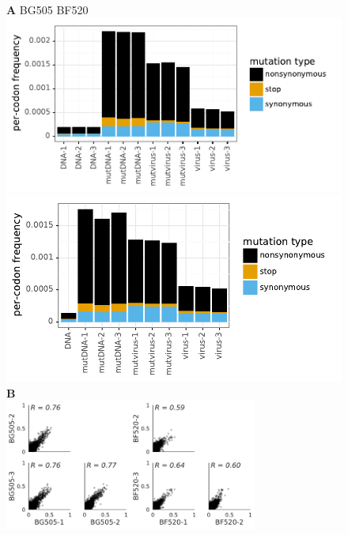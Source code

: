 \documentclass[9pt,lineno]{elife}
\begin{document}
\begin{figure}
{{\bf \Large A} \hspace{0.2\textwidth} BG505 \hspace{0.51\textwidth} BF520} \\
{\includegraphics[height=0.32\textwidth]{figures/BG505_avgmutfreqs.pdf}\includegraphics[clip=true,trim=0in 0in 1.7in 0in,height=0.32\textwidth]{figures/BF520_avgmutfreqs.pdf}} \\
{\bf \Large B} \\
{\includegraphics[width=0.37\textwidth]{figures/BG505_prefscorr.pdf}\hspace{0.1\textwidth}\includegraphics[width=0.37\textwidth]{figures/BF520_prefscorr.pdf}}

\end{figure}
\end{document}
